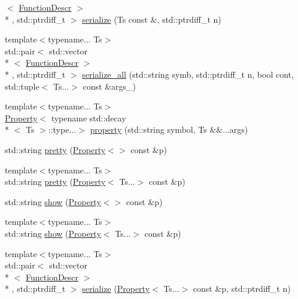 \begin{DoxyCompactItemize}
$<$ \hyperlink{structpfq_1_1lang_1_1FunctionDescr}{Function\+Descr} $>$\\*
, std\+::ptrdiff\+\_\+t $>$ \hyperlink{namespacepfq_1_1lang_ae121f9fc8e23fbd6873d45d02e9adb81}{serialize} (Ts const \&, std\+::ptrdiff\+\_\+t n)
\item 
{\footnotesize template$<$typename... Ts$>$ }\\std\+::pair$<$ std\+::vector\\*
$<$ \hyperlink{structpfq_1_1lang_1_1FunctionDescr}{Function\+Descr} $>$\\*
, std\+::ptrdiff\+\_\+t $>$ \hyperlink{namespacepfq_1_1lang_aa384517310897d6b63391f8c967d414a}{serialize\+\_\+all} (std\+::string symb, std\+::ptrdiff\+\_\+t n, bool cont, std\+::tuple$<$ Ts...$>$ const \&args\+\_\+)
\item 
{\footnotesize template$<$typename... Ts$>$ }\\\hyperlink{structpfq_1_1lang_1_1Property}{Property}$<$ typename std\+::decay\\*
$<$ Ts $>$\+::type...$>$ \hyperlink{namespacepfq_1_1lang_a1249450e72229273b0db707a286aea91}{property} (std\+::string symbol, Ts \&\&...args)
\item 
std\+::string \hyperlink{namespacepfq_1_1lang_ac2521931d090c58e1edaf556692f66d2}{pretty} (\hyperlink{structpfq_1_1lang_1_1Property}{Property}$<$$>$ const \&p)
\item 
{\footnotesize template$<$typename... Ts$>$ }\\std\+::string \hyperlink{namespacepfq_1_1lang_a01ac15382eaa4332ddaae1c3657f657f}{pretty} (\hyperlink{structpfq_1_1lang_1_1Property}{Property}$<$ Ts...$>$ const \&p)
\item 
std\+::string \hyperlink{namespacepfq_1_1lang_ad0e3d7a27621b981fa381f110ba59db7}{show} (\hyperlink{structpfq_1_1lang_1_1Property}{Property}$<$$>$ const \&p)
\item 
{\footnotesize template$<$typename... Ts$>$ }\\std\+::string \hyperlink{namespacepfq_1_1lang_aa58f3721ec181d491b3622910976a5a0}{show} (\hyperlink{structpfq_1_1lang_1_1Property}{Property}$<$ Ts...$>$ const \&p)
\item 
{\footnotesize template$<$typename... Ts$>$ }\\std\+::pair$<$ std\+::vector\\*
$<$ \hyperlink{structpfq_1_1lang_1_1FunctionDescr}{Function\+Descr} $>$\\*
, std\+::ptrdiff\+\_\+t $>$ \hyperlink{namespacepfq_1_1lang_a956b382a50bf645055d71331cacf9a06}{serialize} (\hyperlink{structpfq_1_1lang_1_1Property}{Property}$<$ Ts...$>$ const \&p, std\+::ptrdiff\+\_\+t n)

\end{DoxyCompactItemize}
